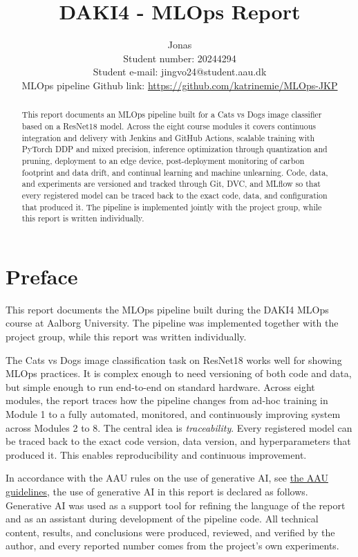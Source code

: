 \documentclass[10pt,twocolumn,letterpaper]{article}
\begin{document}
\title{DAKI4 - MLOps Report}
\author{Jonas\\
Student number: 20244294\\
Student e-mail: jingvo24@student.aau.dk\\
MLOps pipeline Github link: \url{https://github.com/katrinemie/MLOps-JKP}
}
\maketitle

\begin{abstract}
This report documents an MLOps pipeline built for a Cats vs Dogs image classifier based on a ResNet18 model. Across the eight course modules it covers continuous integration and delivery with Jenkins and GitHub Actions, scalable training with PyTorch DDP and mixed precision, inference optimization through quantization and pruning, deployment to an edge device, post-deployment monitoring of carbon footprint and data drift, and continual learning and machine unlearning. Code, data, and experiments are versioned and tracked through Git, DVC, and MLflow so that every registered model can be traced back to the exact code, data, and configuration that produced it. The pipeline is implemented jointly with the project group, while this report is written individually.
\end{abstract}

\section*{Preface}
This report documents the MLOps pipeline built during the DAKI4 MLOps course at Aalborg University. The pipeline was implemented together with the project group, while this report was written individually.

The Cats vs Dogs image classification task on ResNet18 works well for showing MLOps practices. It is complex enough to need versioning of both code and data, but simple enough to run end-to-end on standard hardware. Across eight modules, the report traces how the pipeline changes from ad-hoc training in Module 1 to a fully automated, monitored, and continuously improving system across Modules 2 to 8. The central idea is \emph{traceability}. Every registered model can be traced back to the exact code version, data version, and hyperparameters that produced it. This enables reproducibility and continuous improvement.

In accordance with the AAU rules on the use of generative AI, see \href{https://www.studerende.aau.dk/regler-og-praktisk/regler/regler-for-brug-af-generativ-ai}{the AAU guidelines}, the use of generative AI in this report is declared as follows. Generative AI was used as a support tool for refining the language of the report and as an assistant during development of the pipeline code. All technical content, results, and conclusions were produced, reviewed, and verified by the author, and every reported number comes from the project's own experiments.
\end{document}
